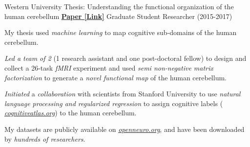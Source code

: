 \begin{cventries}
  \cventry
    {Western University} %
    {Thesis: Understanding the functional organization of the human cerebellum}
    {\href{http://ivrylab.berkeley.edu/uploads/4/1/1/5/41152143/functional_boundaries_in_the_human_cerebellum.pdf}{\textbf{Paper [Link]}}}
    {Graduate Student Researcher (2015-2017)} %
    {
      \begin{cvitems} %
        \item {My thesis used \textit{machine learning} to map cognitive sub-domains of the human cerebellum.}
      	\item {\textit{Led a team of 2} (1 research assistant and one post-doctoral fellow) to design and collect a 26-task \textit{fMRI} experiment and used \textit{semi non-negative matrix factorization} to generate a \textit{novel functional map} of the human cerebellum.}
      	\item {\textit{Initiated} a \textit{collaboration} with scientists from Stanford University to use \textit{natural language processing and regularized regression} to assign cognitive labels ( {\href{https://cognitiveatlas.org/}{\textit{cognitiveatlas.org}}}) to the human cerebellum.}
      	\item {My datasets are publicly available on {\href{https://openneuro.org/datasets/ds002105/versions/1.1.0}{\textit{openneuro.org}}}, and have been downloaded by \textit{hundreds of researchers}.}
      \end{cvitems}
    }

\end{cventries}
